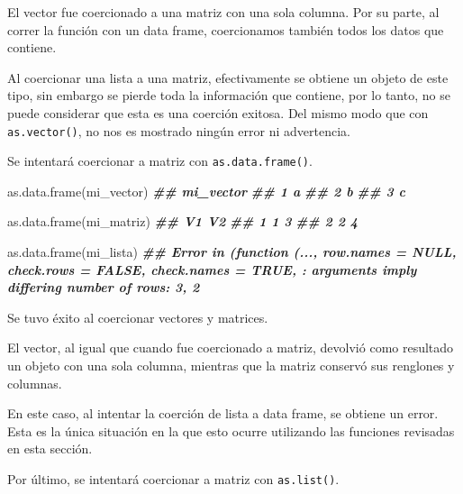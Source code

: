 \documentclass[
]{book}
\newenvironment{Shaded}{\begin{snugshade}}{\end{snugshade}}
\newcommand{\DocumentationTok}[1]{\textcolor[rgb]{0.56,0.35,0.01}{\textbf{\textit{#1}}}}
\newcommand{\FunctionTok}[1]{\textcolor[rgb]{0.00,0.00,0.00}{#1}}
\newcommand{\NormalTok}[1]{#1}
\begin{document}
El vector fue coercionado a una matriz con una sola columna. Por su parte, al correr la función con un data frame, coercionamos también todos los datos que contiene.

Al coercionar una lista a una matriz, efectivamente se obtiene un objeto de este tipo, sin embargo se pierde toda la información que contiene, por lo tanto, no se puede considerar que esta es una coerción exitosa. Del mismo modo que con \texttt{as.vector()}, no nos es mostrado ningún error ni advertencia.

Se intentará coercionar a matriz con \texttt{as.data.frame()}.

\begin{Shaded}
\begin{Highlighting}[]
\FunctionTok{as.data.frame}\NormalTok{(mi\_vector)}
\DocumentationTok{\#\#   mi\_vector}
\DocumentationTok{\#\# 1         a}
\DocumentationTok{\#\# 2         b}
\DocumentationTok{\#\# 3         c}

\FunctionTok{as.data.frame}\NormalTok{(mi\_matriz)}
\DocumentationTok{\#\#   V1 V2}
\DocumentationTok{\#\# 1  1  3}
\DocumentationTok{\#\# 2  2  4}

\FunctionTok{as.data.frame}\NormalTok{(mi\_lista)}
\DocumentationTok{\#\# Error in (function (..., row.names = NULL, check.rows = FALSE, check.names = TRUE, : arguments imply differing number of rows: 3, 2}
\end{Highlighting}
\end{Shaded}

Se tuvo éxito al coercionar vectores y matrices.

El vector, al igual que cuando fue coercionado a matriz, devolvió como resultado un objeto con una sola columna, mientras que la matriz conservó sus renglones y columnas.

En este caso, al intentar la coerción de lista a data frame, se obtiene un error. Esta es la única situación en la que esto ocurre utilizando las funciones revisadas en esta sección.

Por último, se intentará coercionar a matriz con \texttt{as.list()}.

\begin{Shaded}
\end{Shaded}
\end{document}
